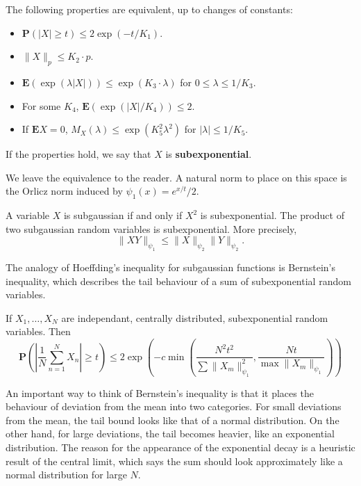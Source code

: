 \begin{theorem}
    The following properties are equivalent, up to changes of constants:
    \begin{itemize}
        \item $\mathbf{P}(|X| \geq t) \leq 2 \exp(-t/K_1)$.
        \item $\| X \|_p \leq K_2 \cdot p$.
        \item $\mathbf{E}(\exp(\lambda |X|)) \leq \exp(K_3 \cdot \lambda)$ for $0 \leq \lambda \leq 1/K_3$.
        \item For some $K_4$, $\mathbf{E}(\exp(|X|/K_4)) \leq 2$.
        \item If $\mathbf{E} X = 0$, $M_X(\lambda) \leq \exp(K_5^2 \lambda^2)$ for $|\lambda| \leq 1/K_5$.
    \end{itemize}
    If the properties hold, we say that $X$ is {\bf subexponential}.
\end{theorem}

We leave the equivalence to the reader. A natural norm to place on this space is the Orlicz norm induced by $\psi_1(x) = e^{x/t}/2$.

\begin{lemma}
    A variable $X$ is subgaussian if and only if $X^2$ is subexponential. The product of two subgaussian random variables is subexponential. More precisely,
    \[ \| X Y \|_{\psi_1} \leq \| X \|_{\psi_2} \| Y \|_{\psi_2}. \]
\end{lemma}

The analogy of Hoeffding's inequality for subgaussian functions is Bernstein's inequality, which describes the tail behaviour of a sum of subexponential random variables.

\begin{theorem}
    If $X_1, \dots, X_N$ are independant, centrally distributed, subexponential random variables. Then
    \[ \mathbf{P} \left( \left| \frac{1}{N} \sum_{n = 1}^N X_n \right| \geq t \right) \leq 2 \exp \left( -c \min \left( \frac{N^2 t^2}{\sum \| X_m \|_{\psi_1}^2}, \frac{N t}{\max \| X_m \|_{\psi_1}} \right) \right) \]
\end{theorem}

An important way to think of Bernstein's inequality is that it places the behaviour of deviation from the mean into two categories. For small deviations from the mean, the tail bound looks like that of a normal distribution. On the other hand, for large deviations, the tail becomes heavier, like an exponential distribution. The reason for the appearance of the exponential decay is a heuristic result of the central limit, which says the sum should look approximately like a normal distribution for large $N$.













